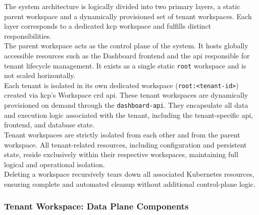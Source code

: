 \documentclass[11pt, a4paper, oneside, listof=totoc]{scrartcl}
\begin{document}
                The system architecture is logically divided into two primary layers, a static
                parent workspace and a dynamically provisioned set of tenant workspaces.
                Each layer corresponds to a dedicated \gls{kcp} workspace and fulfills distinct
                responsibilities.
                \\
                The parent workspace acts as the control plane of the system.
                It hosts globally accessible resources such as the Dashboard frontend and the
                \gls{api} responsible for tenant lifecycle management.
                It exists as a single static \texttt{root} workspace and is not scaled horizontally.
                \\
                Each tenant is isolated in its own dedicated workspace (\texttt{root:<tenant-id>})
                created via \gls{kcp}'s Workspace \gls{crd} \gls{api}.
                These tenant workspaces are dynamically provisioned on demand through the
                \texttt{dashboard-\gls{api}}.
                They encapsulate all data and execution logic associated with the tenant, including
                the tenant-specific \gls{api}, frontend, and database state.
                \\
                Tenant workspaces are strictly isolated from each other and from the parent
                workspace.
                All tenant-related resources, including configuration and persistent state, reside
                exclusively within their respective workspaces, maintaining full logical and
                operational isolation.
                \\
                Deleting a workspace recursively tears down all associated Kubernetes resources,
                ensuring complete and automated cleanup without additional control-plane logic.
                \cleardoublepage

            \subsubsection{Tenant Workspace: Data Plane Components}
\end{document}
